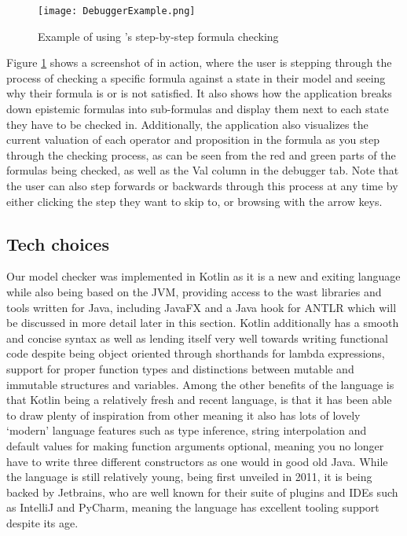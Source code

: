 \begin{figure}[h]
	\label{fig:debugExmpl}
	\caption{Example of using \cname's step-by-step formula checking}
	\texttt{[image: DebuggerExample.png]}
\end{figure}


Figure \ref{fig:debugExmpl} shows a screenshot of \cname in action, where the user is stepping through the process of checking a specific formula against a state in their model and seeing why their formula is or is not satisfied. It also shows how the application breaks down epistemic formulas into sub-formulas and display them next to each state they have to be checked in. Additionally, the application also visualizes the current valuation of each operator and proposition in the formula as you step through the checking process, as can be seen from the red and green parts of the formulas being checked, as well as the Val column in the debugger tab. Note that the user can also step forwards or backwards through this process at any time by either clicking the step they want to skip to, or browsing with the arrow keys. 

\subsection{Tech choices}

Our model checker was implemented in Kotlin as it is a new and exiting language while also being based on the JVM, providing access to the wast libraries and tools written for Java, including JavaFX and a Java hook for ANTLR which will be discussed in more detail later in this section. Kotlin additionally has a smooth and concise syntax as well as lending itself very well towards writing functional code despite being object oriented through shorthands for lambda expressions, support for proper function types and distinctions between mutable and immutable structures and variables. Among the other benefits of the language is that Kotlin being a relatively fresh and recent language, is that it has been able to draw plenty of inspiration from other  meaning it also has lots of lovely `modern' language features such as type inference, string interpolation and default values for making function arguments optional, meaning you no longer have to write three different constructors as one would in good old Java. While the language is still relatively young, being first unveiled in 2011\cite{KotlinHello}, it is being backed by Jetbrains, who are well known for their suite of plugins and IDEs such as IntelliJ and PyCharm, meaning the language has excellent tooling support despite its age.

